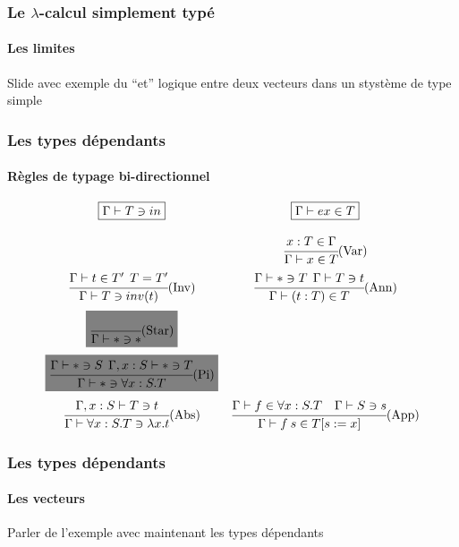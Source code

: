 \documentclass{beamer}
\newcommand{\highlight}[1]{\text{\colorbox{gray}{$#1$}}}
\newcommand{\subst}[3]{#1[#2 := #3]}
\begin{document}
\begin{frame}
  \frametitle{Le $\lambda$-calcul simplement typé}
  \framesubtitle{Les limites}

  Slide avec exemple du ``et'' logique entre deux vecteurs 
  dans un stystème de type simple
  
\end{frame}
\begin{frame}
  \frametitle{Les types dépendants}
  \framesubtitle{Règles de typage bi-directionnel}
  
  \[
  \begin{array}{cc}
  \boxed{\Gamma\vdash T \ni in}
  &
  \boxed{\Gamma\vdash ex \in T}
  \bigskip
  \\ 
  &
  \cfrac{x:T \in \Gamma}
        {\Gamma \vdash x \in T }\mbox{(Var)}
  \medskip
  \\
  \cfrac{\Gamma \vdash t \in T' \:\: T=T'}
        {\Gamma\vdash T \ni inv(t)}\mbox{(Inv)}
  &
  \cfrac{\Gamma\vdash * \ni T \:\:\Gamma\vdash T \ni t}
        {\Gamma\vdash (t:T) \in T}\mbox{(Ann)}
  \medskip
  \\
  \highlight{
  \cfrac{}
        {\Gamma \vdash * \ni *}\mbox{(Star)} }
  \medskip
  \\
  \highlight{
  \cfrac{\Gamma \vdash * \ni S\:\:\Gamma,x:S \vdash *\ni T}
        {\Gamma\vdash * \ni \forall x:S.T}\mbox{(Pi)} }
  \medskip
  \\
  \cfrac{\Gamma,x:S\vdash T \ni t}
        {\Gamma \vdash \forall x:S.T \ni \lambda x. t}\mbox{(Abs)} 
  & 
  \cfrac{\Gamma \vdash f \in \forall x:S.T \quad \Gamma\vdash S \ni s }
        {\Gamma\vdash f\:s\in \subst{T}{s}{x}}\mbox{(App)} 
  \end{array}
  \]


\end{frame}
\begin{frame}
  \frametitle{Les types dépendants}
  \framesubtitle{Les vecteurs}
  
  Parler de l'exemple avec maintenant les types dépendants

\end{frame}
\end{document}
